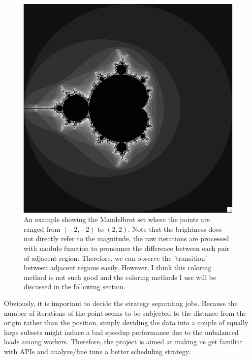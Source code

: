 \documentclass[12pt]{article}
\begin{document}
\begin{center}
    \begin{figure}
        \includegraphics[scale=.5]{./coloring_ta.png}
        \caption{An example showing the Mandelbrot set where the points are ranged from $(-2, -2)$ to $(2, 2)$. Note that the brightness does not directly refer to the magnitude, the raw iterations are processed with modulo function to pronounce the difference between each pair of adjacent region. Therefore, we can observe the 'transition' between adjacent regions easily. However, I think this coloring method is not such good and the coloring methods I use will be discussed in the following section.}
    \end{figure}
\end{center}

\newpage

Obviously, it is important to decide the strategy separating jobs. Because the number of iterations of the point seems to be subjected to the distance from the origin rather than the position, simply deviding the data into a couple of equally large subsets might induce a bad speedup performance due to the unbalanced loads among workers. Therefore, the project is aimed at making us get familiar with APIs and analyze/fine tune a better scheduling strategy.
\end{document}
